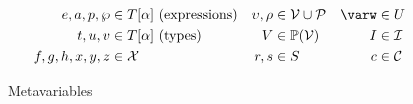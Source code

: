 \begin{figure}
\centering
\begin{align*}
e, a, p, \wp &\in T[\alpha] \ \text{(expressions)} & \upsilon, \rho &\in \mathcal{V} \cup \mathcal{P} & \varw &\in U \\
t, u, v  &\in T[\alpha] \ \text{(types)} & V &\in \mathbb{P}(\mathcal{V}) & I &\in \mathcal{I}\\
f, g, h, x, y, z &\in \mathcal{X} & r, s &\in S & c &\in \mathcal{C}
\end{align*}
\caption{Metavariables}
\label{fig:metavariables}
\end{figure}